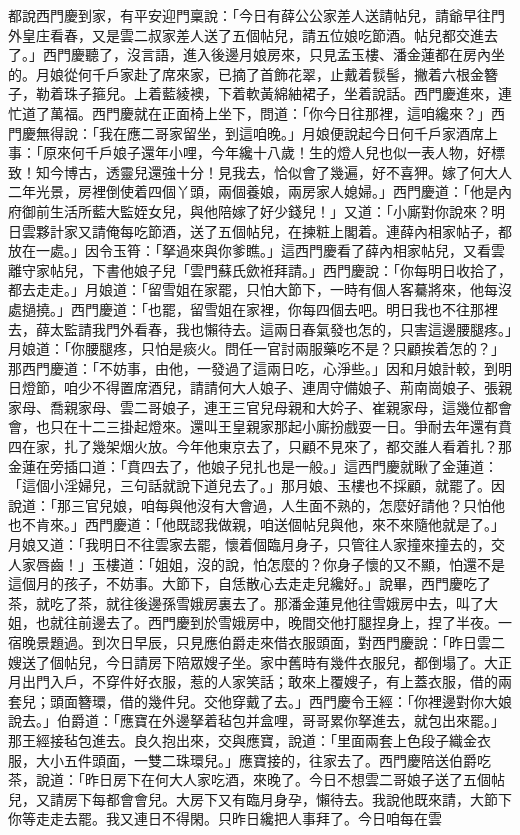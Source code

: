 \begin{showcontents}{}
都說西門慶到家，有平安迎門稟說：「今日有薛公公家差人送請帖兒，請爺早往門外皇庄看春，又是雲二叔家差人送了五個帖兒，請五位娘吃節酒。帖兒都交進去了。」西門慶聽了，沒言語，進入後邊月娘房來，只見孟玉樓、潘金蓮都在房內坐的。月娘從何千戶家赴了席來家，已摘了首飾花翠，止戴着䯼髻，撇着六根金簪子，勒着珠子箍兒。上着藍綾襖，下着軟黃綿紬裙子，坐着說話。西門慶進來，連忙道了萬福。西門慶就在正面椅上坐下，問道：「你今日往那裡，這咱纔來？」西門慶無得說：「我在應二哥家留坐，到這咱晚。」月娘便說起今日何千戶家酒席上事：「原來何千戶娘子還年小哩，今年纔十八歲！生的燈人兒也似一表人物，好標致！知今博古，透靈兒還強十分！見我去，恰似會了幾遍，好不喜狎。嫁了何大人二年光景，房裡倒使着四個丫頭，兩個養娘，兩房家人媳婦。」西門慶道：「他是內府御前生活所藍大監姪女兒，與他陪嫁了好少錢兒！」又道：「小廝對你說來？明日雲夥計家又請俺每吃節酒，送了五個帖兒，在揀粧上閣着。連薛內相家帖子，都放在一處。」因令玉筲：「拏過來與你爹瞧。」這西門慶看了薛內相家帖兒，又看雲離守家帖兒，下書他娘子兒「雲門蘇氏歛袵拜請。」西門慶說：「你每明日收拾了，都去走走。」月娘道：「留雪姐在家罷，只怕大節下，一時有個人客驀將來，他每沒處撾撓。」西門慶道：「也罷，留雪姐在家裡，你每四個去吧。明日我也不往那裡去，薛太監請我門外看春，我也懶待去。這兩日春氣發也怎的，只害這邊腰腿疼。」月娘道：「你腰腿疼，只怕是痰火。問任一官討兩服藥吃不是？只顧挨着怎的？」那西門慶道：「不妨事，由他，一發過了這兩日吃，心淨些。」因和月娘計較，到明日燈節，咱少不得置席酒兒，請請何大人娘子、連周守備娘子、荊南崗娘子、張親家母、喬親家母、雲二哥娘子，連王三官兒母親和大妗子、崔親家母，這幾位都會會，也只在十二三掛起燈來。還叫王皇親家那起小廝扮戲耍一日。爭耐去年還有賁四在家，扎了幾架烟火放。今年他東京去了，只顧不見來了，都交誰人看着扎？那金蓮在旁插口道：「賁四去了，他娘子兒扎也是一般。」這西門慶就瞅了金蓮道：「這個小淫婦兒，三句話就說下道兒去了。」那月娘、玉樓也不採顧，就罷了。因說道：「那三官兒娘，咱每與他沒有大會過，人生面不熟的，怎麼好請他？只怕他也不肯來。」西門慶道：「他既認我做親，咱送個帖兒與他，來不來隨他就是了。」月娘又道：「我明日不往雲家去罷，懷着個臨月身子，只管往人家撞來撞去的，交人家唇齒！」玉樓道：「姐姐，沒的說，怕怎麼的？你身子懷的又不顯，怕還不是這個月的孩子，不妨事。大節下，自恁散心去走走兒纔好。」說畢，西門慶吃了茶，就吃了茶，就往後邊孫雪娥房裏去了。那潘金蓮見他往雪娥房中去，叫了大姐，也就往前邊去了。西門慶到於雪娥房中，晚間交他打腿捏身上，捏了半夜。一宿晚景題過。到次日早辰，只見應伯爵走來借衣服頭面，對西門慶說：「昨日雲二嫂送了個帖兒，今日請房下陪眾嫂子坐。家中舊時有幾件衣服兒，都倒塌了。大正月出門入戶，不穿件好衣服，惹的人家笑話；敢來上覆嫂子，有上蓋衣服，借的兩套兒；頭面簪環，借的幾件兒。交他穿戴了去。」西門慶令王經：「你裡邊對你大娘說去。」伯爵道：「應寶在外邊拏着毡包并盒哩，哥哥累你拏進去，就包出來罷。」那王經接毡包進去。良久抱出來，交與應寶，說道：「里面兩套上色段子織金衣服，大小五件頭面，一雙二珠環兒。」應寶接的，往家去了。西門慶陪送伯爵吃茶，說道：「昨日房下在何大人家吃酒，來晚了。今日不想雲二哥娘子送了五個帖兒，又請房下每都會會兒。大房下又有臨月身孕，懶待去。我說他既來請，大節下你等走走去罷。我又連日不得閑。只昨日纔把人事拜了。今日咱每在雲
\end{showcontents}

